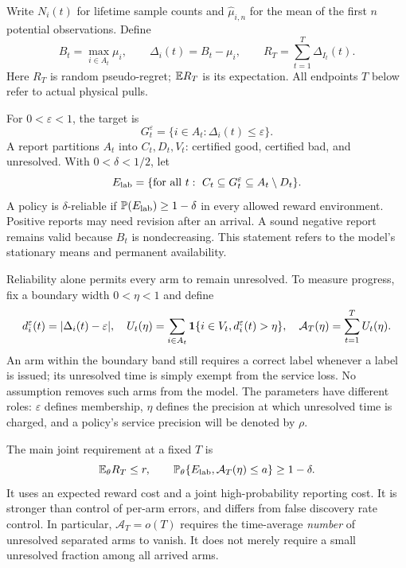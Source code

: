 \documentclass[11pt]{article}
\begin{document}
Write $N_i(t)$ for lifetime sample counts and $\widehat\mu_{i,n}$ for the mean
of the first $n$ potential observations. Define
\[
 B_t=\max_{i\in A_t}\mu_i,\qquad
 \Delta_i(t)=B_t-\mu_i,\qquad
 R_T=\sum_{t=1}^T\Delta_{I_t}(t).
\]
Here $R_T$ is random pseudo-regret; $\mathbb E R_T$ is its expectation.
All endpoints $T$ below refer to actual physical pulls.

For $0<\varepsilon<1$, the target is
\[
 G_t^\varepsilon=\{i\in A_t:\Delta_i(t)\le\varepsilon\}.
\]
A report partitions $A_t$ into $C_t,D_t,V_t$: certified good, certified bad,
and unresolved. With $0<\delta<1/2$, let
\[
 E_{\rm lab}=\{\text{for all }t:\ C_t\subseteq G_t^\varepsilon
                                  \subseteq A_t\setminus D_t\}.
\]
A policy is $\delta$-reliable if $\mathbb P(E_{\rm lab})\ge1-\delta$ in every
allowed reward environment. Positive reports may need revision after an
arrival. A sound negative report remains valid because $B_t$ is nondecreasing.
This statement refers to the model's stationary means and permanent availability.

Reliability alone permits every arm to remain unresolved. To measure progress,
fix a boundary width $0<\eta<1$ and define
\begin{equation}
 d_i^\varepsilon(t)=|\Delta_i(t)-\varepsilon|,\quad
 U_t(\eta)=\sum_{i\in A_t}\mathbf 1\{i\in V_t,d_i^\varepsilon(t)>\eta\},\quad
 \mathcal A_T(\eta)=\sum_{t=1}^TU_t(\eta).
 \label{eq:area}
\end{equation}
An arm within the boundary band still requires a correct label whenever a
label is issued; its unresolved time is simply exempt from the service loss.
No assumption removes such arms from the model. The parameters have different
roles: $\varepsilon$ defines membership, $\eta$ defines the precision at which
unresolved time is charged, and a policy's service precision will be denoted
by $\rho$.

The main joint requirement at a fixed $T$ is
\begin{equation}
 \mathbb E_\theta R_T\le r,\qquad
 \mathbb P_\theta\{E_{\rm lab},\mathcal A_T(\eta)\le a\}\ge1-\delta.
 \label{eq:joint_protocol}
\end{equation}
It uses an expected reward cost and a joint high-probability reporting cost.
It is stronger than control of per-arm errors, and differs from false discovery
rate control. In particular, $\mathcal A_T=o(T)$ requires the time-average
\emph{number} of unresolved separated arms to vanish. It does not merely
require a small unresolved fraction among all arrived arms.
\end{document}
